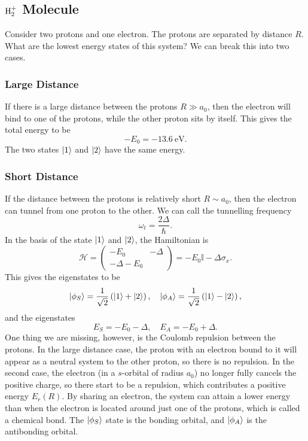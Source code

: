 \documentclass{article}
\begin{document}
\subsection{$\textrm H_2^+$ Molecule}
Consider two protons and one electron. The protons are separated by distance $R$. What are the lowest energy states of this system? We can break this into two cases.

\subsubsection{Large Distance}
If there is a large distance between the protons $R\gg a_0$, then the electron will bind to one of the protons, while the other proton sits by itself. This gives the total energy to be 
\[
    -E_0=-\SI{13.6}{\electronvolt}.
\]
The two states $\ket{1}$ and $\ket{2}$ have the same energy.

\subsubsection{Short Distance}
If the distance between the protons is relatively short $R\sim a_0$, then the electron can tunnel from one proton to the other. We can call the tunnelling frequency 
\[
    \omega _t=\frac{2\Delta }{\hbar }.
\]
In the basis of the state $\ket{1}$ and $\ket{2}$, the Hamiltonian is 
\[
    \mathcal{H}=\begin{pmatrix}
        -E_0&-\Delta \\-\Delta -E_0
    \end{pmatrix}=-E_0 \mathbb{I}-\Delta \sigma _x.
\]
This gives the eigenstates to be 
\[
    \ket{\phi _S}=\frac{1}{\sqrt{2}}\left( \ket{1}+\ket{2} \right),\quad \ket{\phi _A}=\frac{1}{\sqrt{2}}\left( \ket{1}-\ket{2} \right),
\]
and the eigenstates 
\[
    E_S=-E_0-\Delta ,\quad E_A=-E_0+\Delta .
\]
One thing we are missing, however, is the Coulomb repulsion between the protons. In the large distance case, the proton with an electron bound to it will appear as a neutral system to the other proton, so there is no repulsion. In the second case, the electron (in a $s$-orbital of radius $a_0$) no longer fully cancels the positive charge, so there start to be a repulsion, which contributes a positive energy $E_r(R)$. By sharing an electron, the system can attain a lower energy than when the electron is located around just one of the protons, which is called a chemical bond. The $\ket{\phi _S}$ state is the bonding orbital, and $\ket{\phi _A}$ is the antibonding orbital.
\end{document}

